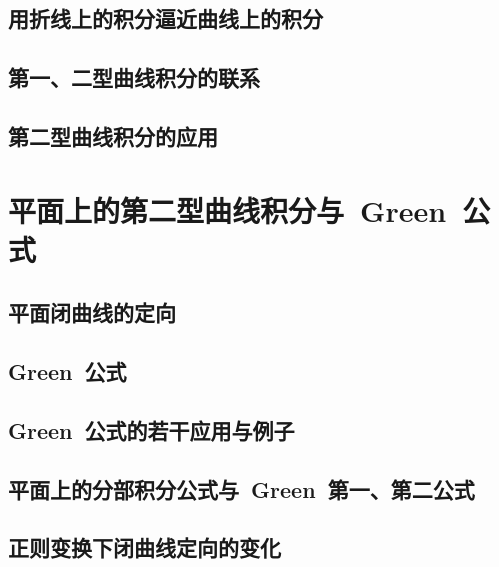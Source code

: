 \subsection{用折线上的积分逼近曲线上的积分}
\subsection{第一、二型曲线积分的联系}
\subsection{第二型曲线积分的应用}
\begin{exercise}

\end{exercise}
\section{平面上的第二型曲线积分与~Green~公式}
\subsection{平面闭曲线的定向}
\subsection{Green~公式}
\subsection{Green~公式的若干应用与例子}
\subsection{平面上的分部积分公式与~Green~第一、第二公式}
\subsection{正则变换下闭曲线定向的变化}
\begin{exercise}

\end{exercise}
\begin{exercise*}

\end{exercise*}




\endinput
